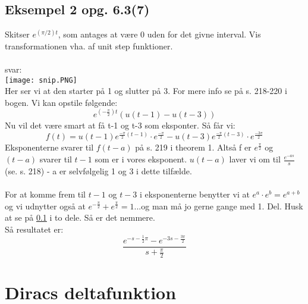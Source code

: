 \documentclass[11pt,fleqn]{book} %
\begin{document}
\subsection{Eksempel 2 opg. 6.3(7)} \label{jojojo}
Skitser $e^{(\pi / 2)t}$, som antages at være 0 uden for det givne interval. Vis transformationen vha. af unit step funktioner. \\\\
svar:\\
\texttt{[image: snip.PNG]}\\
Her ser vi at den starter på 1 og slutter på 3.  For mere info se på s. 218-220 i bogen. Vi kan opstile følgende:
\begin{equation}
e^{(-\frac{\pi}{2})t}(u(t-1)-u(t-3))
\end{equation}
Nu vil det være smart at få t-1 og t-3 som eksponter. Så får vi:
\begin{equation}
f(t)=u(t-1)e^{\frac{-\pi}{2}(t-1)}\cdot e^\frac{-\pi}{2}-u(t-3)e^{\frac{-\pi}{2}(t-3)} \cdot e^{\frac{-3\pi}{2}}
\end{equation}
Eksponenterne svarer til $f(t-a)$ på s. 219 i theorem 1. Altså f er $e^{\frac{\pi}{2}}$ og $(t-a)$ svarer til $t-1$ som er i vores eksponent.
$u(t-a)$  laver vi om til $\frac{e^{-as}}{s}$ (se. s. 218) - a er selvfølgelig 1 og 3 i dette tilfælde.\\\\
For at komme frem til $t-1$ og $t-3$ i eksponenterne benytter vi at $e^a \cdot e^b = e^{a+b}$ og vi udnytter også at $e^{-\frac{\pi}{2}} + e^{\frac{\pi}{2}} = 1$...og man må jo gerne gange med 1. Del. Husk at se på \ref{jojojo} i to dele. Så er det nemmere. \\
Så resultatet er:
\begin{equation}
\frac{e^{-s -\frac{1}{2}\pi}-e^{-3s -\frac{3\pi}{2}}} {s+\frac{\pi}{2}}
\end{equation}

\section{Diracs deltafunktion}
\end{document}
